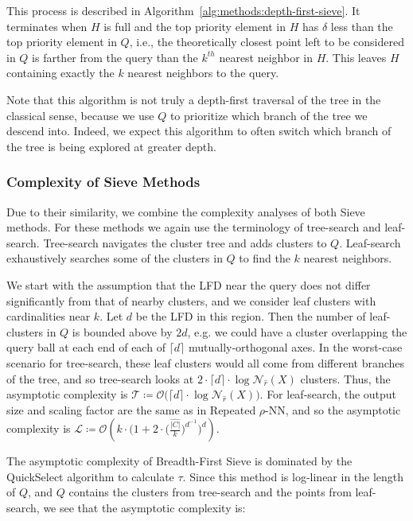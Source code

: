This process is described in Algorithm~\ref{alg:methods:depth-first-sieve}.
It terminates when $H$ is full and the top priority element in $H$ has $\delta$ less than the top priority element in $Q$, i.e., the theoretically closest point left to be considered in $Q$ is farther from the query than the $k^{th}$ nearest neighbor in $H$.
This leaves $H$ containing exactly the $k$ nearest neighbors to the query.




Note that this algorithm is not truly a depth-first traversal of the tree in the classical sense, because we use $Q$ to prioritize which branch of the tree we descend into.
Indeed, we expect this algorithm to often switch which branch of the tree is being explored at greater depth.


\subsubsection{Complexity of Sieve Methods}
\label{sec:methods:knn-search:complexity-of-sieve-methods}

Due to their similarity, we combine the complexity analyses of both Sieve methods.
For these methods we again use the terminology of tree-search and leaf-search.
Tree-search navigates the cluster tree and adds clusters to $Q$.
Leaf-search exhaustively searches some of the clusters in $Q$ to find the $k$ nearest neighbors.

We start with the assumption that the LFD near the query does not differ significantly from that of nearby clusters, and we consider leaf clusters with cardinalities near $k$.
Let $d$ be the LFD in this region.
Then the number of leaf-clusters in $Q$ is bounded above by $2d$, e.g. we could have a cluster overlapping the query ball at each end of each of $\lceil d \rceil$ mutually-orthogonal axes.
In the worst-case scenario for tree-search, these leaf clusters would all come from different branches of the tree, and so tree-search looks at $2 \cdot \lceil d \rceil \cdot \log \mathcal{N}_{\hat{r}}(X)$ clusters.
Thus, the asymptotic complexity is $\mathcal{T} \coloneqq \mathcal{O} \big( \lceil d \rceil \cdot \log \mathcal{N}_{\hat{r}}(X) \big)$.
For leaf-search, the output size and scaling factor are the same as in Repeated $\rho$-NN, and so the asymptotic complexity is $\mathcal{L} \coloneqq \mathcal{O} \left( k \cdot \bigg( 1 + 2 \cdot \Big( \frac{\hat{|C|}}{k} \Big) ^ {d^{-1}} \bigg)^d \right)$.

The asymptotic complexity of Breadth-First Sieve is dominated by the QuickSelect algorithm to calculate $\tau$.
Since this method is log-linear in the length of $Q$, and $Q$ contains the clusters from tree-search and the points from leaf-search, we see that the asymptotic complexity is:

